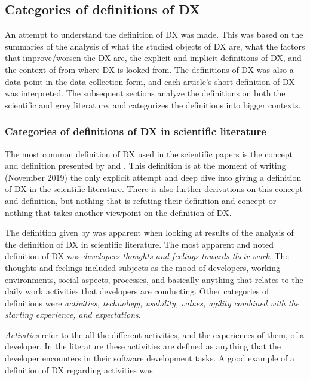 \documentclass[english, 12pt, a4paper, sci, utf8, a-1b, online]{aaltothesis}
\newcommand{\now}{November 2019}
\begin{document}
\subsection{Categories of definitions of DX}

An attempt to understand the definition of DX was made. This was based on the summaries of the analysis of what the studied objects of DX are, what the factors that improve/worsen the DX are, the explicit and implicit definitions of DX, and the context of from where DX is looked from. The definitions of DX was also a data point in the data collection form, and each article's short definition of DX was interpreted. The subsequent sections analyze the definitions on both the scientific and grey literature, and categorizes the definitions into bigger contexts.

\subsubsection{Categories of definitions of DX in scientific literature}

The most common definition of DX used in the scientific papers is the concept and definition presented by \textcite{fagerholm-dx-concept-and-definition} and \textcite{fagerholm-doctoral-thesis}. This definition is at the moment of writing (\now) the only explicit attempt and deep dive into giving a definition of DX in the scientific literature. There is also further derivations on this concept and definition, but nothing that is refuting their definition and concept or nothing that takes another viewpoint on the definition of DX.

The definition given by \textcite{fagerholm-dx-concept-and-definition} was apparent when looking at results of the analysis of the definition of DX in scientific literature. The most apparent and noted definition of DX was \textit{developers thoughts and feelings towards their work}. The thoughts and feelings included subjects as the mood of developers, working environments, social aspects, processes, and basically anything that relates to the daily work activities that developers are conducting. Other categories of definitions were \textit{activities, technology, usability, values, agility combined with the starting experience, and expectations}.

\textit{Activities} refer to the all the different activities, and the experiences of them, of a developer. In the literature these activities are defined as anything that the developer encounters in their software development tasks. A good example of a definition of DX regarding activities was
\end{document}
